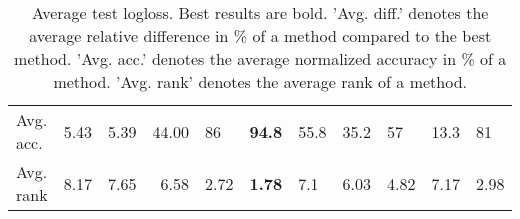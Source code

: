 \begin{table}[ht!]
\begin{tabular}{lllrlllllll}
  Avg. acc. & 5.43 & 5.39 & 44.00 & 86 & \textbf{94.8} & 55.8 & 35.2 & 57 & 13.3 & 81 \\ 
  Avg. rank & 8.17 & 7.65 & 6.58 & 2.72 & \textbf{1.78} & 7.1 & 6.03 & 4.82 & 7.17 & 2.98 \\ 
   \hline
\hline
\end{tabular}
\endgroup
\caption{Average test logloss. 
                  Best results are bold. 
                  'Avg. diff.' denotes the average relative difference in \% of a method compared to the best method.
                  'Avg. acc.' denotes the average normalized accuracy in \% of a method.
                  'Avg. rank' denotes the average rank of a method.} 
\label{TABLES/table_results_logloss_mahalanobis}
\end{table}

